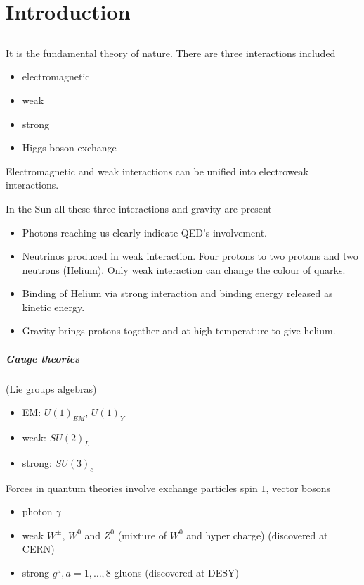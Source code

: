 \chapter{Introduction}
\section{\sm}
It is the fundamental theory of nature. There are three interactions included
\begin{itemize}
   \item electromagnetic
   \item weak
   \item strong
   \item Higgs boson exchange
\end{itemize}
Electromagnetic and weak interactions can be unified into electroweak interactions. 

In the Sun all these three interactions and gravity are present
\begin{itemize}
   \item Photons reaching us clearly indicate QED's involvement.
   \item Neutrinos produced in weak interaction. Four protons to two protons and two neutrons (Helium). 
      Only weak interaction can change the colour of quarks. 
   \item Binding of Helium via strong interaction and binding energy released as kinetic energy.
   \item Gravity brings protons together and at high temperature to give helium.
\end{itemize}

\paragraph{Gauge theories} (Lie groups algebras)
\begin{itemize}
   \item EM: $U(1)_{EM}$, $U(1)_Y$
   \item weak: $SU(2)_L$
   \item strong: $SU(3)_c$
\end{itemize}

Forces in quantum theories involve exchange particles spin $1$, vector bosons
\begin{itemize}
   \item photon $\gamma$
   \item weak $W^{\pm}$, $W^0$ and $Z^0$ (mixture of $W^0$ and hyper charge) (discovered at CERN)
   \item strong $g^a, a=1,\dots,8$ gluons (discovered at DESY)
\end{itemize}

